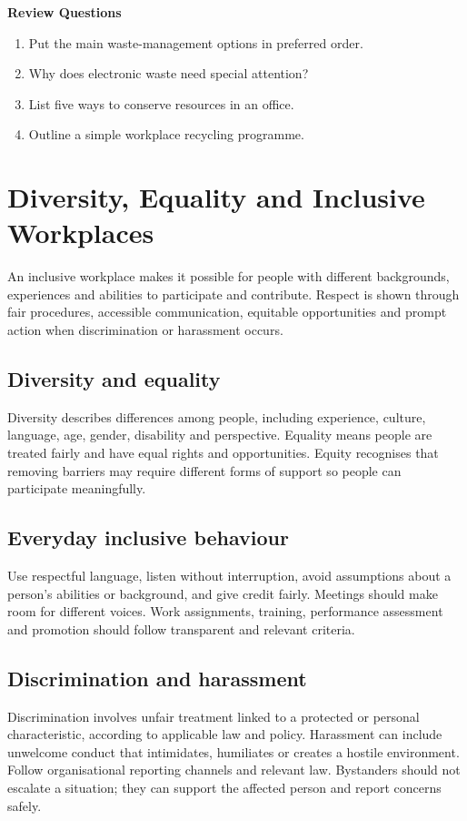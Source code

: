 \documentclass[11pt,openany,oneside]{book}
\begin{document}
\par\noindent\textbf{Review Questions}\begin{enumerate}[label=\arabic*.,leftmargin=1.8em,itemsep=2pt,topsep=2pt]
\item Put the main waste-management options in preferred order.
\item Why does electronic waste need special attention?
\item List five ways to conserve resources in an office.
\item Outline a simple workplace recycling programme.
\end{enumerate}

\chapter{Diversity, Equality and Inclusive Workplaces}
An inclusive workplace makes it possible for people with different backgrounds, experiences and abilities to participate and contribute. Respect is shown through fair procedures, accessible communication, equitable opportunities and prompt action when discrimination or harassment occurs.

\section{Diversity and equality}
Diversity describes differences among people, including experience, culture, language, age, gender, disability and perspective. Equality means people are treated fairly and have equal rights and opportunities. Equity recognises that removing barriers may require different forms of support so people can participate meaningfully.

\section{Everyday inclusive behaviour}
Use respectful language, listen without interruption, avoid assumptions about a person's abilities or background, and give credit fairly. Meetings should make room for different voices. Work assignments, training, performance assessment and promotion should follow transparent and relevant criteria.

\section{Discrimination and harassment}
Discrimination involves unfair treatment linked to a protected or personal characteristic, according to applicable law and policy. Harassment can include unwelcome conduct that intimidates, humiliates or creates a hostile environment. Follow organisational reporting channels and relevant law. Bystanders should not escalate a situation; they can support the affected person and report concerns safely.
\end{document}
